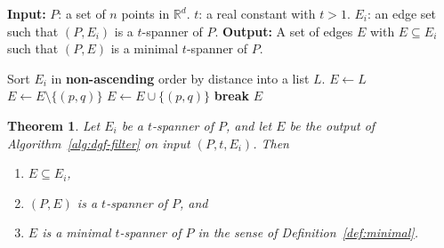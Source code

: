 \documentclass{article}
\newtheorem{theorem}{Theorem}
\begin{document}
\begin{algorithm}[h]
\caption{Descending Greedy Filter on a $t$-spanner}
\label{alg:dgf-filter}
\begin{algorithmic}[1]
\Statex \textbf{Input:}
\Statex \hspace{1cm} $P$: a set of $n$ points in $\mathbb{R}^d$.
\Statex \hspace{1cm} $t$: a real constant with $t>1$.
\Statex \hspace{1cm} $E_i$: an edge set such that $(P,E_i)$ is a $t$-spanner of $P$.
\Statex \textbf{Output:}
\Statex \hspace{1cm} A set of edges $E$ with $E\subseteq E_i$ such that $(P,E)$ is a minimal $t$-spanner of $P$.

\State Sort $E_i$ in \textbf{non-ascending} order by distance into a list $L$.
\State $E \leftarrow L$
    \State $E \leftarrow E \setminus \{(p,q)\}$
            \State $E \leftarrow E \cup \{(p,q)\}$
            \State \textbf{break}
        \EndIf
    \EndFor
\EndFor
\State \Return $E$
\end{algorithmic}
\end{algorithm}

\begin{theorem}\label{thm:filter-minimal}
Let $E_i$ be a $t$-spanner of $P$, and let $E$ be the output of
Algorithm~\ref{alg:dgf-filter} on input $(P,t,E_i)$. Then
\begin{enumerate}
    \item $E \subseteq E_i$,
    \item $(P,E)$ is a $t$-spanner of $P$, and
    \item $E$ is a minimal $t$-spanner of $P$ in the sense of
          Definition~\ref{def:minimal}.
\end{enumerate}
\end{theorem}
\end{document}
